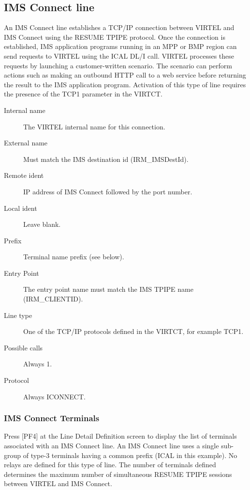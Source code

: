 \documentclass[letterpaper,10pt,english]{sphinxmanual}
\begin{document}
\subsection{IMS Connect line}
\label{\detokenize{connectivity_guide:ims-connect-line}}
An IMS Connect line establishes a TCP/IP connection between VIRTEL and IMS Connect using the RESUME TPIPE protocol. Once the connection is established, IMS application programs running in an MPP or BMP region can send requests to VIRTEL using the ICAL DL/I call. VIRTEL processes these requests by launching a customer-written scenario. The scenario can perform actions such as making an outbound HTTP call to a web service before returning the result to the IMS application program. Activation of this type of line requires the presence of the TCP1 parameter in the VIRTCT.

\begin{description}
\item[{Internal name}] \leavevmode
The VIRTEL internal name for this connection.

\item[{External name}] \leavevmode
Must match the IMS destination id (IRM\_IMSDestId).

\item[{Remote ident}] \leavevmode
IP address of IMS Connect followed by the port number.

\item[{Local ident}] \leavevmode
Leave blank.

\item[{Prefix}] \leavevmode
Terminal name prefix (see below).

\item[{Entry Point}] \leavevmode
The entry point name must match the IMS TPIPE name (IRM\_CLIENTID).

\item[{Line type}] \leavevmode
One of the TCP/IP protocols defined in the VIRTCT, for example TCP1.

\item[{Possible calls}] \leavevmode
Always 1.

\item[{Protocol}] \leavevmode
Always ICONNECT.

\end{description}


\subsubsection{IMS Connect Terminals}
\label{\detokenize{connectivity_guide:ims-connect-terminals}}
Press {[}PF4{]} at the Line Detail Definition screen to display the list of terminals associated with an IMS Connect line. An IMS Connect line uses a single sub-group of type-3 terminals having a common prefix (ICAL in this example). No relays are defined for this type of line. The number of terminals defined determines the maximum number of simultaneous RESUME TPIPE sessions between VIRTEL and IMS Connect.
\end{document}
